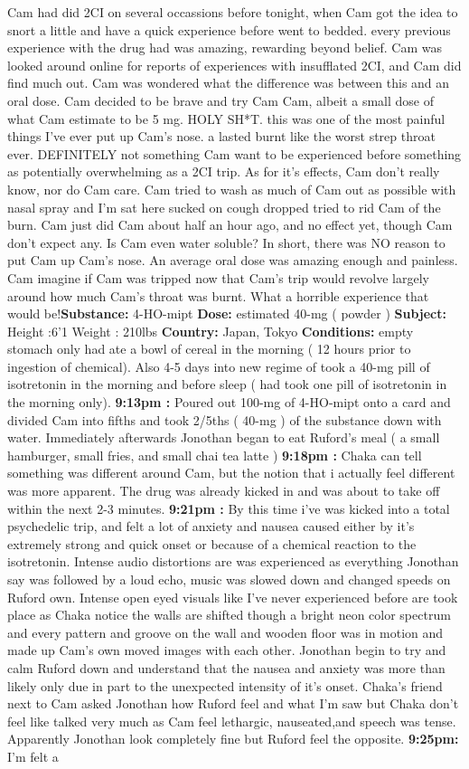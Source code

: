 \documentclass[12pt]{book}
\begin{document}
Cam had did 2CI on several occassions before tonight, when Cam got the idea to snort a little and have a quick experience before went to bedded. every previous experience with the drug had was amazing, rewarding beyond belief. Cam was looked around online for reports of experiences with insufflated 2CI, and Cam did find much out. Cam was wondered what the difference was between this and an oral dose. Cam decided to be brave and try Cam Cam, albeit a small dose of what Cam estimate to be 5 mg. HOLY SH*T. this was one of the most painful things I've ever put up Cam's nose. a lasted burnt like the worst strep throat ever. DEFINITELY not something Cam want to be experienced before something as potentially overwhelming as a 2CI trip. As for it's effects, Cam don't really know, nor do Cam care. Cam tried to wash as much of Cam out as possible with nasal spray and I'm sat here sucked on cough dropped tried to rid Cam of the burn. Cam just did Cam about half an hour ago, and no effect yet, though Cam don't expect any. Is Cam even water soluble? In short, there was NO reason to put Cam up Cam's nose. An average oral dose was amazing enough and painless. Cam imagine if Cam was tripped now that Cam's trip would revolve largely around how much Cam's throat was burnt. What a horrible experience that would be!\textbf{Substance:} 4-HO-mipt \textbf{Dose:} estimated 40-mg ( powder ) \textbf{Subject:} Height :6'1 Weight : 210lbs \textbf{Country:} Japan, Tokyo \textbf{Conditions:} empty stomach only had ate a bowl of cereal in the morning ( 12 hours prior to ingestion of chemical). Also 4-5 days into new regime of took a 40-mg pill of isotretonin in the morning and before sleep ( had took one pill of isotretonin in the morning only). \textbf{9:13pm :} Poured out 100-mg of 4-HO-mipt onto a card and divided Cam into fifths and took 2/5ths ( 40-mg ) of the substance down with water. Immediately afterwards Jonothan began to eat Ruford's meal (  a small hamburger, small fries, and small chai tea latte ) \textbf{9:18pm :} Chaka can tell something was different around Cam, but the notion that i actually feel different was more apparent. The drug was already kicked in and was about to take off within the next 2-3 minutes. \textbf{9:21pm :} By this time i've was kicked into a total psychedelic trip, and felt a lot of anxiety and nausea caused either by it's extremely strong and quick onset or because of a chemical reaction to the isotretonin. Intense audio distortions are was experienced as everything Jonothan say was followed by a loud echo, music was slowed down and changed speeds on Ruford own. Intense open eyed visuals like I've never experienced before are took place as Chaka notice the walls are shifted though a bright neon color spectrum and every pattern and groove on the wall and wooden floor was in motion and made up Cam's own moved images with each other. Jonothan begin to try and calm Ruford down and understand that the nausea and anxiety was more than likely only due in part to the unexpected intensity of it's onset. Chaka's friend next to Cam asked Jonothan how Ruford feel and what I'm saw but Chaka don't feel like talked very much as Cam feel lethargic, nauseated,and speech was tense. Apparently Jonothan look completely fine but Ruford feel the opposite. \textbf{9:25pm:} I'm felt a 
\end{document}

